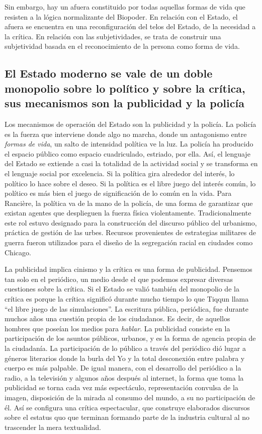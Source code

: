 Sin embargo, hay un afuera constituido por todas aquellas formas de vida que resisten a la lógica normalizante del Biopoder. En relación con el Estado, el afuera se encuentra en una reconfiguración del telos del Estado, de la necesidad a la crítica. En relación con las subjetividades, se trata de construir una subjetividad basada en el reconocimiento de la persona como forma de vida.

\subsection{El Estado moderno se vale de un doble monopolio sobre lo político y sobre la crítica, sus mecanismos son la publicidad y la policía}
\label{sub:el-estado-moderno-se-vale-de}

Los mecanismos de operación del Estado son la publicidad y la policía. La policía es la fuerza que interviene donde algo no marcha, donde un antagonismo entre \emph{formas de vida}, un salto de intensidad política ve la luz. La policía ha producido el espacio público como espacio cuadriculado, estriado, por ella. Así, el lenguaje del Estado se extiende a casi la totalidad de la actividad social y se transforma en el lenguaje social por excelencia. Si la política gira alrededor del interés, lo político lo hace sobre el deseo. Si la política es el libre juego del interés común, lo político es más bien el juego de significación de lo común en la vida. Para Rancière, la política va de la mano de la policía, de una forma de garantizar que existan agentes que desplieguen la fuerza física violentamente.\autocite{laclauPopulistReason2005} Tradicionalmente este rol estuvo designado para la construcción del discurso público del urbanismo, práctica de gestión de las urbes. Recursos provenientes de estrategias militares de guerra fueron utilizados para el diseño de la segregación racial en ciudades como Chicago.

La publicidad implica cinismo y la crítica es una forma de publicidad. Pensemos tan solo en el periódico, un medio desde el que podemos expresar diversas cuestiones sobre la crítica. Si el Estado se valió también del monopolio de la crítica es porque la crítica significó durante mucho tiempo lo que Tiqqun llama \enquote{el libre juego de las simulaciones}. La escritura pública, periódica, fue durante muchos años una cuestión propia de los ciudadanos. Es decir, de aquellos hombres que poseían los medios para \emph{hablar}. La publicidad consiste en la participación de los asuntos públicos, urbanos, y es la forma de agencia propia de la ciudadanía. La participación de lo público a través del periódico dió lugar a géneros literarios donde la burla del Yo y la total desconexión entre palabra y cuerpo es más palpable. De igual manera, con el desarrollo del periódico a la radio, a la televisión y algunos años después al internet, la forma que toma la publicidad se torna cada vez más espectáculo, representación convulsa de la imagen, disposición de la mirada al consumo del mundo, a su no participación de él. Así se configura una crítica espectacular, que construye elaborados discursos sobre el estatus quo que terminan formando parte de la industria cultural al no trascender la mera textualidad.

